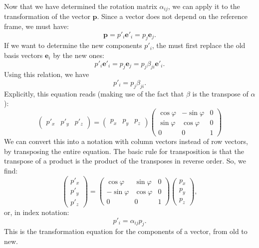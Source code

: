 Now that we have determined the rotation matrix $\alpha_{ij}$, we can apply it to the transformation of the vector $\mathbf{p}$.  Since a vector does not depend
on the reference frame, we must have:
\begin{equation}
	\mathbf{p}=p'_{i}\mathbf{e}'_{i} = p_{j}\mathbf{e}_{j}.
\end{equation}
If we want to determine the new components $p'_{i}$, the must first replace the old basis vectors $\mathbf{e}_{i}$ by the new ones:
\begin{equation}
	p'_{i}\mathbf{e}'_{i} = p_{j}\mathbf{e}_{j}=p_{j}\beta_{ji}\mathbf{e}'_{i}.
\end{equation}
Using this relation, we have
\begin{equation}
	p'_{i} = p_{j}\beta_{ji}.
\end{equation}
Explicitly, this equation reads (making use of the fact that $\beta$ is the transpose of $\alpha$):
\begin{equation}
	\left(\begin{array}{ccc}p'_{x}&p'_{y}&p'_{z}\end{array}\right) = 
	\left(\begin{array}{ccc}p_{x}&p_{y}&p_{z}\end{array}\right)  \left(\begin{array}{ccc}\cos\varphi & -\sin\varphi & 0\\
	\sin\varphi&\cos\varphi&0\\
	0&0&1\end{array}\right)
\end{equation}
We can convert this into a notation with column vectors instead of row vectors, by transposing the entire equation.  The basic rule for transposition
is that the transpose of a product is the product of the transposes in reverse order.  So, we find:
\begin{equation}
	\left(\begin{array}{c}p'_{x}\\ p'_{y}\\ p'_{z}\end{array}\right) = 
	\left(\begin{array}{ccc}\cos\varphi & \sin\varphi & 0\\
	-\sin\varphi&\cos\varphi&0\\
	0&0&1\end{array}\right)
	\left(\begin{array}{c}p_{x}\\ p_{y}\\ p_{z}\end{array}\right),
\end{equation}
or, in index notation:
\begin{equation}
	p'_{i} = \alpha_{ij}p_{j}.
\end{equation}
This is the transformation equation for the components of a vector, from old to new.

